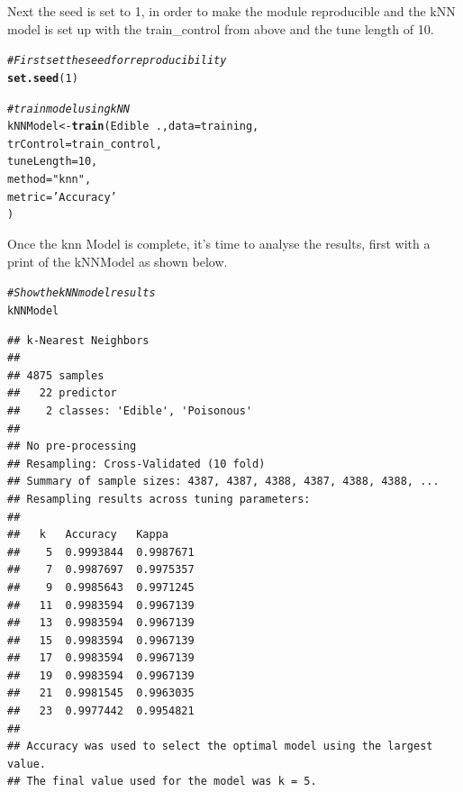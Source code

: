 \documentclass[10pt  ,usenames, dvipsnames]{article}\usepackage[]{graphicx}\usepackage[]{color}
\makeatletter
\newcommand{\hlnum}[1]{\textcolor[rgb]{0.686,0.059,0.569}{#1}}%
\newcommand{\hlstr}[1]{\textcolor[rgb]{0.192,0.494,0.8}{#1}}%
\newcommand{\hlcom}[1]{\textcolor[rgb]{0.678,0.584,0.686}{\textit{#1}}}%
\newcommand{\hlopt}[1]{\textcolor[rgb]{0,0,0}{#1}}%
\newcommand{\hlstd}[1]{\textcolor[rgb]{0.345,0.345,0.345}{#1}}%
\newcommand{\hlkwb}[1]{\textcolor[rgb]{0.69,0.353,0.396}{#1}}%
\newcommand{\hlkwc}[1]{\textcolor[rgb]{0.333,0.667,0.333}{#1}}%
\newcommand{\hlkwd}[1]{\textcolor[rgb]{0.737,0.353,0.396}{\textbf{#1}}}%
\newenvironment{kframe}{%
 \def\at@end@of@kframe{}%
 \ifinner\ifhmode%
  \def\at@end@of@kframe{\end{minipage}}%
  \begin{minipage}{\columnwidth}%
 \fi\fi%
 \def\FrameCommand##1{\hskip\@totalleftmargin \hskip-\fboxsep
 \colorbox{shadecolor}{##1}\hskip-\fboxsep
     \hskip-\linewidth \hskip-\@totalleftmargin \hskip\columnwidth}%
 \MakeFramed {\advance\hsize-\width
   \@totalleftmargin\z@ \linewidth\hsize
   \@setminipage}}%
 {\par\unskip\endMakeFramed%
 \at@end@of@kframe}
\newenvironment{knitrout}{}{} %
\makeatother
\begin{document}
Next the seed is set to 1, in order to make the module reproducible and the kNN model is set up with the train_control from above and the tune length of 10.
\begin{knitrout}
\color{fgcolor}\begin{kframe}
\begin{alltt}
\hlcom{#First set the seed for reproducibility}
\hlkwd{set.seed}\hlstd{(}\hlnum{1}\hlstd{)}

\hlcom{#train model using kNN}
\hlstd{kNNModel} \hlkwb{<-} \hlkwd{train}\hlstd{(Edible} \hlopt{~} \hlstd{.,} \hlkwc{data} \hlstd{= training,}
                  \hlkwc{trControl} \hlstd{= train_control,}
                  \hlkwc{tuneLength} \hlstd{=}\hlnum{10}\hlstd{,}
                  \hlkwc{method} \hlstd{=} \hlstr{"knn"}\hlstd{,}
                  \hlkwc{metric} \hlstd{=} \hlstr{'Accuracy'}
\hlstd{)}
\end{alltt}
\end{kframe}
\end{knitrout}




\clearpage
Once the knn Model is complete, it's time to analyse the results, first with a print of the kNNModel as shown below.

\begin{knitrout}
\color{fgcolor}\begin{kframe}
\begin{alltt}
\hlcom{#Show the kNN model results}
\hlstd{kNNModel}
\end{alltt}
\end{kframe}
\end{knitrout}



\begin{knitrout}
\color{fgcolor}\begin{kframe}
\begin{verbatim}
## k-Nearest Neighbors 
## 
## 4875 samples
##   22 predictor
##    2 classes: 'Edible', 'Poisonous' 
## 
## No pre-processing
## Resampling: Cross-Validated (10 fold) 
## Summary of sample sizes: 4387, 4387, 4388, 4387, 4388, 4388, ... 
## Resampling results across tuning parameters:
## 
##   k   Accuracy   Kappa    
##    5  0.9993844  0.9987671
##    7  0.9987697  0.9975357
##    9  0.9985643  0.9971245
##   11  0.9983594  0.9967139
##   13  0.9983594  0.9967139
##   15  0.9983594  0.9967139
##   17  0.9983594  0.9967139
##   19  0.9983594  0.9967139
##   21  0.9981545  0.9963035
##   23  0.9977442  0.9954821
## 
## Accuracy was used to select the optimal model using the largest value.
## The final value used for the model was k = 5.
\end{verbatim}
\end{kframe}
\end{knitrout}
\end{document}

